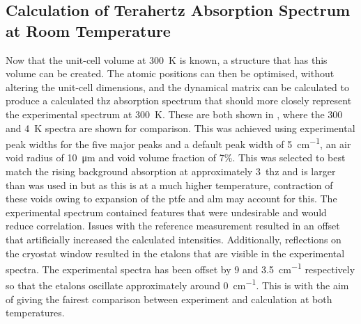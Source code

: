 \subsection{Calculation of Terahertz Absorption Spectrum at Room Temperature}
Now that the unit\nobreakdash-cell volume at \SI{300}{K} is known, a structure that has this volume can be created. The atomic positions can then be optimised, without altering the unit\nobreakdash-cell dimensions, and the dynamical matrix can be calculated to produce a calculated \acrshort{thz} absorption spectrum that should more closely represent the experimental spectrum at \SI{300}{K}. These are both shown in , where the 300 and \SI{4}{K} spectra are shown for comparison. This was achieved using experimental peak widths for the five major peaks and a default peak width of \SI{5}{cm^{-1}}, an air void radius of \SI{10}{\micro\metre} and void volume fraction of 7\%. This was selected to best match the rising background absorption at approximately \SI{3}{\acrshort{thz}} and is larger than was used in  but as this is at a much higher temperature, contraction of these voids owing to expansion of the \acrshort{ptfe} and \acrshort{alm} may account for this. The experimental spectrum contained features that were undesirable and would reduce correlation. Issues with the reference measurement resulted in an offset that artificially increased the calculated intensities. Additionally, reflections on the cryostat window resulted in the etalons that are visible in the experimental spectra. The experimental spectra has been offset by 9 and \SI{3.5}{cm^{-1}} respectively so that the etalons oscillate approximately around \SI{0}{cm^{-1}}. This is with the aim of giving the fairest comparison between experiment and calculation at both temperatures.

